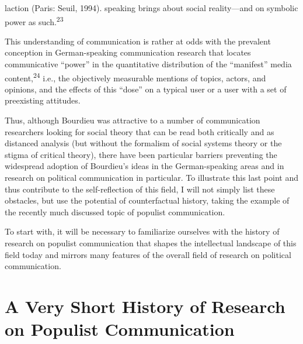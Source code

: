 \documentclass{tufte-handout}
\begin{document}
{{    l\textquotesingle action} (Paris: Seuil, 1994).} speaking
brings about social reality---and on symbolic power as such.\textsuperscript{23}

This understanding of communication is rather at odds with the prevalent
conception in German-speaking communication research that locates
communicative ``power'' in the quantitative distribution of the
``manifest'' media content,\textsuperscript{24} i.e., the objectively measurable mentions of topics, actors,
and opinions, and the effects of this ``dose'' on a typical user or a
user with a set of preexisting attitudes.

Thus, although Bourdieu was attractive to a number of communication
researchers looking for social theory that can be read both critically
and as distanced analysis (but without the formalism of social systems
theory or the stigma of critical theory), there have been particular
barriers preventing the widespread adoption of Bourdieu's ideas in the
German-speaking areas and in research on political communication in
particular. To illustrate this last point and thus contribute to the
self-reflection of this field, I will not simply list these obstacles,
but use the potential of counterfactual history, taking the example of
the recently much discussed topic of populist communication.

To start with, it will be necessary to familiarize ourselves with the
history of research on populist communication that shapes the
intellectual landscape of this field today and mirrors many features of
the overall field of research on political communication.

\hypertarget{a-very-short-history-of-research-on-populist-communication}{%
\section{A Very Short History of Research on Populist
Communication}\label{a-very-short-history-of-research-on-populist-communication}}
\end{document}
